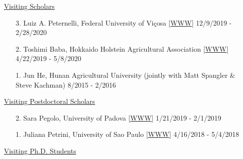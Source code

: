 \documentclass[margin,line,10pt]{res}
\begin{document}
\begin{resume}
\begin{flushleft}
\hspace{0.2cm} \underline{Visiting Scholars}
\end{flushleft}
\begin{enumerate}

\item [3.] Luiz A. Peternelli, Federal University of Vi\c cosa [\textcolor{blue}{\href{http://www.dpi.ufv.br/~peternelli/}{WWW}}]  \hfill 12/9/2019 - 2/28/2020

  \vspace{0.3cm}

      
\item [2.] Toshimi Baba, Hokkaido Holstein Agricultural Association [\textcolor{blue}{\href{https://researchmap.jp/t-baba/?lang=english}{WWW}}]  \hfill  4/22/2019 - 5/8/2020
  
  \vspace{0.3cm}

\item [1.] Jun He, Hunan Agricultural University (jointly with Matt Spangler \& Steve Kachman)  \hfill  8/2015 - 2/2016 
\end{enumerate}



\begin{flushleft}
\hspace{0.2cm} \underline{Visiting Postdoctoral Scholars}
\end{flushleft}
\begin{enumerate}
\item [2.] Sara Pegolo,  University of Padova [\textcolor{blue}{\href{https://www.researchgate.net/profile/Sara_Pegolo}{WWW}}]  \hfill 1/21/2019 - 2/1/2019
  
  \vspace{0.3cm}

\item [1.] Juliana Petrini,  University of Sao Paulo  [\textcolor{blue}{\href{https://www.researchgate.net/profile/Juliana_Petrini}{WWW}}]  \hfill  4/16/2018 - 5/4/2018
\end{enumerate}






\begin{flushleft}
\hspace{0.2cm} \underline{Visiting Ph.D. Students}
\end{flushleft}
\begin{enumerate}


\end{enumerate}
\end{resume}
\end{document}
